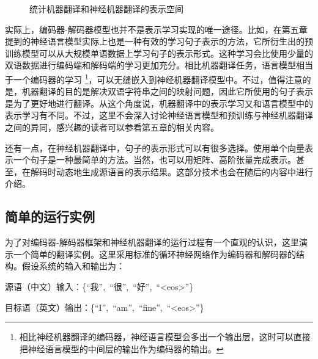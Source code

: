 \begin{figure}[htp]
    \centering
    
    \caption{统计机器翻译和神经机器翻译的表示空间}
    \label{fig:6-6}
\end{figure}

\parinterval 实际上，编码器-解码器模型也并不是表示学习实现的唯一途径。比如，在第五章提到的神经语言模型实际上也是一种有效的学习句子表示的方法，它所衍生出的预训练模型可以从大规模单语数据上学习句子的表示形式。这种学习会比使用少量的双语数据进行编码端和解码端的学习更加充分。相比机器翻译任务，语言模型相当于一个编码器的学习 \footnote{相比神经机器翻译的编码器，神经语言模型会多出一个输出层，这时可以直接把神经语言模型的中间层的输出作为编码器的输出。}，可以无缝嵌入到神经机器翻译模型中。不过，值得注意的是，机器翻译的目的是解决双语字符串之间的映射问题，因此它所使用的句子表示是为了更好地进行翻译。从这个角度说，机器翻译中的表示学习又和语言模型中的表示学习有不同。不过，这里不会深入讨论神经语言模型和预训练与神经机器翻译之间的异同，感兴趣的读者可以参看第五章的相关内容。

\parinterval 还有一点，在神经机器翻译中，句子的表示形式可以有很多选择。使用单个向量表示一个句子是一种最简单的方法。当然，也可以用矩阵、高阶张量完成表示。甚至，在解码时动态地生成源语言的表示结果。这部分技术也会在随后的内容中进行介绍。


\subsection{简单的运行实例}\label{chapter6.2.3}

\parinterval 为了对编码器-解码器框架和神经机器翻译的运行过程有一个直观的认识，这里演示一个简单的翻译实例。这里采用标准的循环神经网络作为编码器和解码器的结构。假设系统的输入和输出为：

\vspace{0.5em}
\parinterval  \hspace{5em} 源语（中文）输入：\{``我'',\ ``很'',\ ``好'',\ ``<eos>''\}

\vspace{0.3em}
\parinterval  \hspace{5em} 目标语（英文）输出：\{``I'',\ ``am'',\ ``fine'',\ ``<eos>''\}
\vspace{0.5em}

